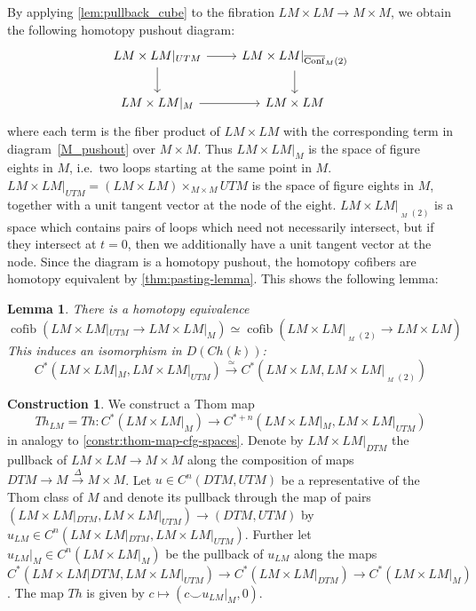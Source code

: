 \documentclass{scrartcl}
\theoremstyle{plain}
\newtheorem{lemma}[theorem]{Lemma}
\theoremstyle{definition}
\newtheorem{construction}[theorem]{Construction}
\newcommand{\cupp}{\mathbin{\smile}}
\DeclareMathOperator{\cofib}{cofib}
\newcommand{\quiso}{\simeq}
\let\xto\xrightarrow
\DeclareMathOperator{\cConf}{\overline{Conf}}
\begin{document}
By applying \cref{lem:pullback_cube} to the fibration $LM\times LM\to M\times M$, we obtain the following homotopy pushout diagram:
\begin{equation}
    \begin{tikzcd}
        LM\times LM|_{UTM} \rar\dar & LM\times LM|_{\cConf_M(2)} \dar \\
        LM\times LM|_M \rar & LM\times LM
    \end{tikzcd}
\end{equation}
where each term is the fiber product of $LM\times LM$ with the corresponding term in diagram~\ref{M_pushout} over $M\times M$. Thus $LM\times LM|_M$ is the space of figure eights in $M$, i.e.\ two loops starting at the same point in $M$. $LM\times LM|_{UTM} = (LM\times LM)\times_{M\times M} UTM$ is the space of figure eights in $M$, together with a unit tangent vector at the node of the eight. $LM\times LM|_{\cConf_M(2)}$ is a space which contains pairs of loops which need not necessarily intersect, but if they intersect at $t=0$, then we additionally have a unit tangent vector at the node. Since the diagram is a homotopy pushout, the homotopy cofibers are homotopy equivalent by \cref{thm:pasting-lemma}. This shows the following lemma:

\begin{lemma}
    There is a homotopy equivalence
    \[ \cofib(LM\times LM|_{UTM}\to LM\times LM|_M) \quiso \cofib(LM\times LM|_{\cConf_M(2)} \to LM\times LM)\]
    This induces an isomorphism in $D(Ch(k))$:
    \[ C^*(LM\times LM|_M, LM\times LM|_{UTM}) \xto{\quiso} C^*(LM\times LM, LM\times LM|_{\cConf_M(2)}) \]
\end{lemma}

\begin{construction}
We construct a Thom map $$Th_{LM} = Th \colon C^*(LM\times LM|_M) \to C^{*+n}(LM\times LM|_M, LM\times LM|_{UTM})$$ in analogy to \cref{constr:thom-map-cfg-spaces}. Denote by $LM\times LM|_{DTM}$ the pullback of $LM\times LM\to M\times M$ along the composition of maps $DTM\to M\xto{\Delta} M\times M$. Let $u\in C^{n}(DTM, UTM)$ be a representative of the Thom class of $M$ and denote its pullback through the map of pairs $(LM\times LM|_{DTM}, LM\times LM|_{UTM})\to (DTM, UTM)$ by $u_{LM}\in C^{n}(LM\times LM|_{DTM}, LM\times LM|_{UTM})$. Further let $u_{LM}|_M\in C^n(LM\times LM|_M)$ be the pullback of $u_{LM}$ along the maps $C^*(LM\times LM|{DTM}, LM\times LM|_{UTM})\to C^*(LM\times LM|_{DTM})\to C^*(LM\times LM|_M)$. The map $Th$ is given by $c\mapsto (c\cupp u_{LM}|_M, 0)$.
\end{construction}
\end{document}
